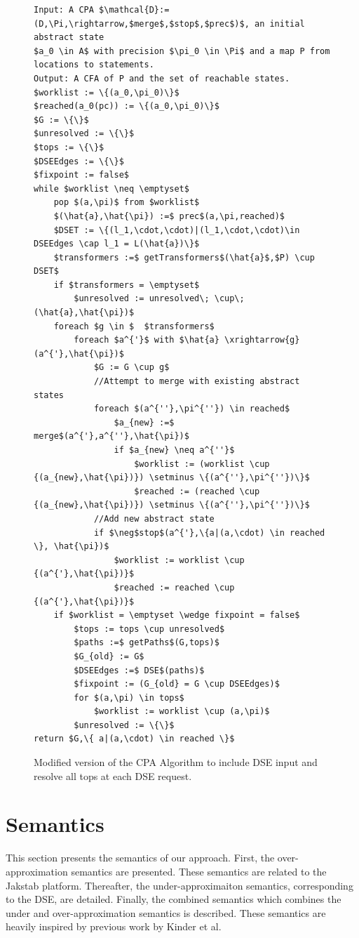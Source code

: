 \documentclass{kththesis}
\begin{document}
\begin{figure}[thb]
    \centering
\begin{lstlisting}[style=algorithm]
Input: A CPA $\mathcal{D}:=(D,\Pi,\rightarrow,$merge$,$stop$,$prec$)$, an initial abstract state
$a_0 \in A$ with precision $\pi_0 \in \Pi$ and a map P from locations to statements.
Output: A CFA of P and the set of reachable states.
$worklist := \{(a_0,\pi_0)\}$
$reached(a_0(pc)) := \{(a_0,\pi_0)\}$
$G := \{\}$
$unresolved := \{\}$
$tops := \{\}$
$DSEEdges := \{\}$
$fixpoint := false$
while $worklist \neq \emptyset$ 
    pop $(a,\pi)$ from $worklist$
    $(\hat{a},\hat{\pi}) :=$ prec$(a,\pi,reached)$
    $DSET := \{(l_1,\cdot,\cdot)|(l_1,\cdot,\cdot)\in DSEEdges \cap l_1 = L(\hat{a})\}$
    $transformers :=$ getTransformers$(\hat{a}$,$P) \cup DSET$
    if $transformers = \emptyset$
        $unresolved := unresolved\; \cup\; (\hat{a},\hat{\pi})$
    foreach $g \in $  $transformers$ 
        foreach $a^{'}$ with $\hat{a} \xrightarrow{g} (a^{'},\hat{\pi})$
            $G := G \cup g$
            //Attempt to merge with existing abstract states
            foreach $(a^{''},\pi^{''}) \in reached$
                $a_{new} :=$ merge$(a^{'},a^{''},\hat{\pi})$
                if $a_{new} \neq a^{''}$
                    $worklist := (worklist \cup {(a_{new},\hat{\pi})}) \setminus \{(a^{''},\pi^{''})\}$
                    $reached := (reached \cup {(a_{new},\hat{\pi})}) \setminus \{(a^{''},\pi^{''})\}$
            //Add new abstract state
            if $\neg$stop$(a^{'},\{a|(a,\cdot) \in reached \}, \hat{\pi})$
                $worklist := worklist \cup {(a^{'},\hat{\pi})}$
                $reached := reached \cup {(a^{'},\hat{\pi})}$
    if $worklist = \emptyset \wedge fixpoint = false$
        $tops := tops \cup unresolved$
        $paths :=$ getPaths$(G,tops)$
        $G_{old} := G$
        $DSEEdges :=$ DSE$(paths)$
        $fixpoint := (G_{old} = G \cup DSEEdges)$
        for $(a,\pi) \in tops$
            $worklist := worklist \cup (a,\pi)$
        $unresolved := \{\}$
return $G,\{ a|(a,\cdot) \in reached \}$
\end{lstlisting}
\caption[Modified version of the CPA Algorithm to include DSE input and resolve all tops at each DSE request.]{Modified version of the CPA Algorithm to include DSE input and resolve all tops at each DSE request.}
    \label{fig:CPAFinal}
\end{figure}

\clearpage

\section{Semantics}
This section presents the semantics of our approach. First, the over-approximation semantics are presented. These semantics are related to the Jakstab platform. Thereafter, the under-approximaiton semantics, corresponding to the DSE, are detailed. Finally, the combined semantics which combines the under and over-approximation semantics is described. These semantics are heavily inspired by previous work by Kinder et al\cite{alternating}.
\end{document}
